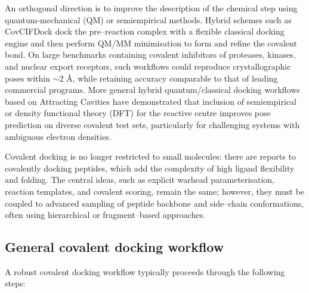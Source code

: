 \documentclass[12pt]{article}
\begin{document}
An orthogonal direction is to improve the description of the chemical step using quantum-mechanical (QM) or semiempirical methods. Hybrid schemes such as CovCIFDock\cite{CH14_CovCIFDock2025} dock the pre–reaction complex with a flexible classical docking engine and then perform QM/MM minimisation to form and refine the covalent bond. On large benchmarks containing covalent inhibitors of proteases, kinases, and nuclear export receptors, such workflows could reproduce crystallographic poses within $\sim$2 \r{A}, while retaining accuracy comparable to that of leading commercial programs. More general hybrid quantum/classical docking workflows based on Attracting Cavities\cite{CH14_HybridQMClassDocking2025,CH14_rohrig2023attracting,CH14_chaskar2017fly} have demonstrated that inclusion of semiempirical or density functional theory (DFT) for the reactive centre improves pose prediction on diverse covalent test sets, particularly for challenging systems with ambiguous electron densities.

Covalent docking is no longer restricted to small molecules: there are reports to covalently docking peptides, which add the complexity of high ligand flexibility and folding.  The central ideas, such as explicit warhead parameterisation, reaction templates, and covalent scoring, remain the same; however, they must be coupled to advanced sampling of peptide backbone and side–chain conformations, often using hierarchical or fragment–based approaches\cite{CH14_Covpepdock}.

\subsection{General covalent docking workflow}

 A robust covalent docking workflow typically proceeds through the following steps:
\end{document}
